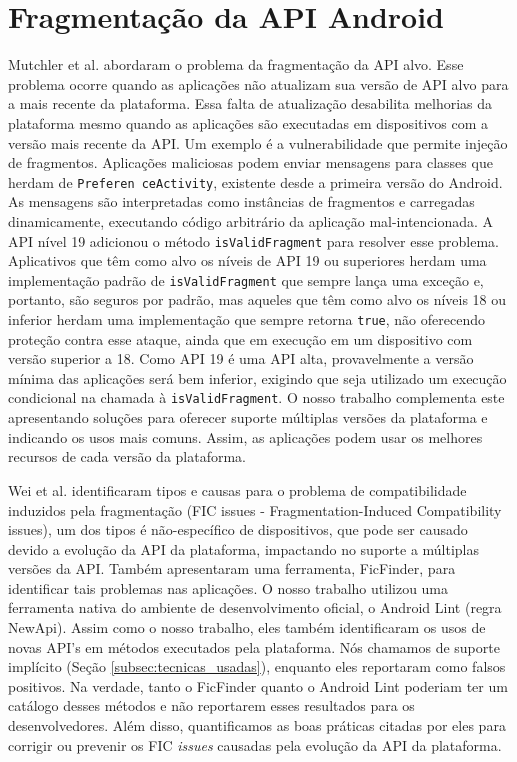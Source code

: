 \section{Fragmentação da API Android}

Mutchler et al. \cite{Mutchler2016} abordaram o problema da fragmentação da API alvo.
Esse problema ocorre quando as aplicações não atualizam sua versão de API alvo para a
mais recente da plataforma. Essa falta de atualização desabilita melhorias da plataforma
mesmo quando as aplicações são executadas em dispositivos com a versão mais recente da API.
Um exemplo é a vulnerabilidade que permite injeção de fragmentos. Aplicações maliciosas
podem enviar mensagens para classes que herdam de
\texttt{Preferen ceActivity}, %
existente
desde a primeira versão do Android. As mensagens são interpretadas como instâncias de
fragmentos e carregadas dinamicamente, executando código arbitrário da aplicação
mal-intencionada. A API nível 19 adicionou o método \texttt{isValidFragment} para resolver
esse problema. Aplicativos que têm como alvo os níveis de API 19 ou superiores herdam uma implementação padrão de \texttt{isValidFragment} que sempre lança uma exceção e, portanto,
são seguros por padrão, mas aqueles que têm como alvo os níveis 18 ou inferior herdam uma implementação que sempre retorna \texttt{true}, não oferecendo proteção contra esse ataque,
ainda que em execução em um dispositivo com versão superior a 18.  Como API 19 é uma API
alta, provavelmente a versão mínima das aplicações  será bem inferior, exigindo que seja
utilizado um execução condicional na chamada à \texttt{isValidFragment}. O nosso trabalho
complementa este apresentando soluções para oferecer suporte múltiplas versões da plataforma
e indicando os usos mais comuns. Assim, as aplicações podem usar os melhores recursos de cada
versão da plataforma. 

Wei et al. \cite{Wei2016} identificaram tipos e causas para o problema de compatibilidade
induzidos pela fragmentação (FIC issues - Fragmentation-Induced Compatibility issues), um
dos tipos é não-específico de dispositivos, que pode ser causado devido a evolução da API da
plataforma, impactando no suporte a múltiplas versões da API. Também apresentaram uma ferramenta, 
FicFinder, para identificar tais problemas nas aplicações. O nosso trabalho utilizou uma ferramenta 
nativa do ambiente de desenvolvimento oficial, o Android Lint (regra NewApi). Assim como o nosso 
trabalho, eles também identificaram os usos de novas API's em métodos executados pela plataforma. Nós 
chamamos de suporte implícito (Seção \ref{subsec:tecnicas_usadas}), enquanto eles reportaram como 
falsos positivos. Na verdade, tanto o FicFinder quanto o Android Lint poderiam ter um catálogo desses 
métodos e não reportarem esses resultados para os desenvolvedores. Além disso, quantificamos as boas 
práticas citadas por eles para corrigir ou prevenir os FIC \textit{issues} causadas pela evolução da API da plataforma.

